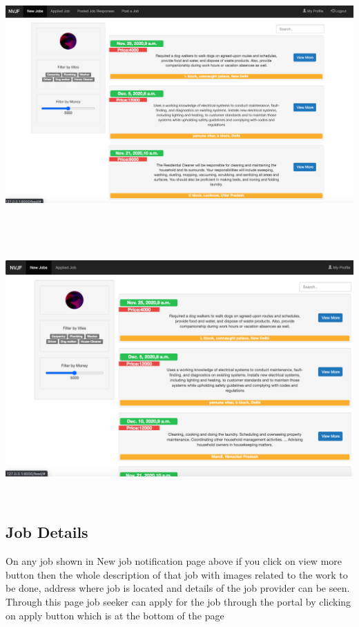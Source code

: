 \documentclass[a4paper 12pt]{article}
\begin{document}
\includegraphics[width=15cm, height=10cm]{feed view for both.png}
\includegraphics[width=15cm, height=10cm]{feed view for job seeker.png}


\subsection{Job Details}
On any job shown in New job notification page above if you click on view more button then the whole description of that job with images related to the work to be done, address where job is located and details of the job provider can be seen. Through this page job seeker can apply for the job through the portal by clicking on apply button which is at the bottom of the page\\
\end{document}
